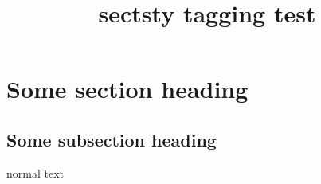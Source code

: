 \documentclass{article}
\title{sectsty tagging test}
\begin{document}
\section{Some section heading}

\subsection{Some subsection heading}

normal text
\end{document}
